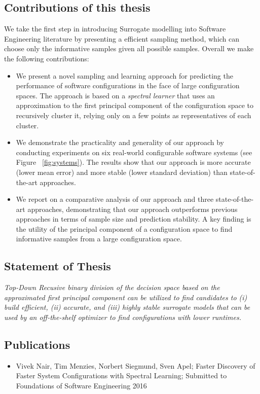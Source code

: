 \documentclass{newsig}
\begin{document}
 \subsection{Contributions of this thesis}
 We take the first step in introducing Surrogate modelling into Software Engineering literature by presenting a efficient sampling method, which can choose only the informative samples given all possible samples. Overall we make the following contributions:
 \begin{itemize}
\item We present a novel sampling and learning approach for predicting the performance of software configurations in the face of large configuration spaces. The approach is based on a
{\em spectral
learner} that uses an approximation to the first principal component of the configuration space to recursively cluster it, relying only on a few points as representatives of each cluster.
\item We demonstrate the practicality and generality of our approach by conducting experiments on six real-world configurable software systems (see Figure ~\ref{fig:systems}). The results show that our approach is more accurate (lower mean error) and more stable (lower standard deviation) than state-of-the-art approaches.
\item We report on a comparative analysis of our approach and three state-of-the-art approaches, demonstrating that our approach outperforms previous approaches in terms of sample size and prediction stability. A key finding is the utility of the principal component of a configuration space to  find informative samples from a large configuration space.
\end{itemize}

\subsection{Statement of Thesis}
\textit{
 Top-Down Recusive binary division of the decision space based on the approximated first principal component can be utilized to find candidates to (i) build efficient, (ii) accurate, and  (iii) highly stable surrogate models that can be used by an off-the-shelf optimizer to find configurations with lower runtimes.
}

\subsection{Publications}
\begin{itemize}
\item{Vivek Nair, Tim Menzies, Norbert Siegmund, Sven Apel; Faster Discovery of Faster System Configurations with Spectral Learning; Submitted to Foundations of Software Engineering 2016}
\end{itemize}
 
\end{document}

